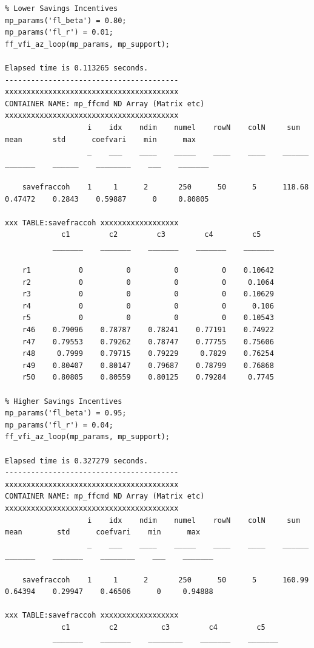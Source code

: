 \documentclass[
]{book}
\begin{document}
\begin{verbatim}
% Lower Savings Incentives
mp_params('fl_beta') = 0.80;
mp_params('fl_r') = 0.01;
ff_vfi_az_loop(mp_params, mp_support);

Elapsed time is 0.113265 seconds.
----------------------------------------
xxxxxxxxxxxxxxxxxxxxxxxxxxxxxxxxxxxxxxxx
CONTAINER NAME: mp_ffcmd ND Array (Matrix etc)
xxxxxxxxxxxxxxxxxxxxxxxxxxxxxxxxxxxxxxxx
                   i    idx    ndim    numel    rowN    colN     sum       mean       std      coefvari    min      max  
                   _    ___    ____    _____    ____    ____    ______    _______    ______    ________    ___    _______

    savefraccoh    1     1      2       250      50      5      118.68    0.47472    0.2843    0.59887      0     0.80805

xxx TABLE:savefraccoh xxxxxxxxxxxxxxxxxx
             c1         c2         c3         c4         c5   
           _______    _______    _______    _______    _______

    r1           0          0          0          0    0.10642
    r2           0          0          0          0     0.1064
    r3           0          0          0          0    0.10629
    r4           0          0          0          0      0.106
    r5           0          0          0          0    0.10543
    r46    0.79096    0.78787    0.78241    0.77191    0.74922
    r47    0.79553    0.79262    0.78747    0.77755    0.75606
    r48     0.7999    0.79715    0.79229     0.7829    0.76254
    r49    0.80407    0.80147    0.79687    0.78799    0.76868
    r50    0.80805    0.80559    0.80125    0.79284     0.7745

% Higher Savings Incentives
mp_params('fl_beta') = 0.95;
mp_params('fl_r') = 0.04;
ff_vfi_az_loop(mp_params, mp_support);

Elapsed time is 0.327279 seconds.
----------------------------------------
xxxxxxxxxxxxxxxxxxxxxxxxxxxxxxxxxxxxxxxx
CONTAINER NAME: mp_ffcmd ND Array (Matrix etc)
xxxxxxxxxxxxxxxxxxxxxxxxxxxxxxxxxxxxxxxx
                   i    idx    ndim    numel    rowN    colN     sum       mean        std      coefvari    min      max  
                   _    ___    ____    _____    ____    ____    ______    _______    _______    ________    ___    _______

    savefraccoh    1     1      2       250      50      5      160.99    0.64394    0.29947    0.46506      0     0.94888

xxx TABLE:savefraccoh xxxxxxxxxxxxxxxxxx
             c1         c2          c3         c4         c5   
           _______    _______    ________    _______    _______


\end{verbatim}
\end{document}
